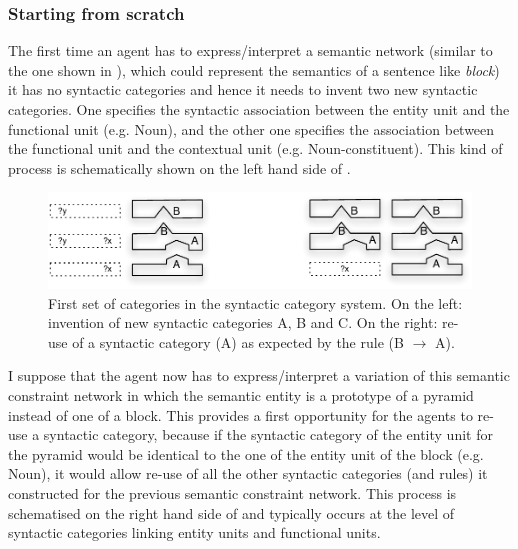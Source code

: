\subsubsection{Starting from scratch}

The first time an agent has to express/interpret a semantic network
(similar to the one shown in ), which
could represent the semantics of a sentence like \textit{block}) it has no
syntactic categories and hence it needs to invent two new syntactic
categories. One specifies the syntactic association between the entity
unit and the functional unit (e.g. Noun), and the other one specifies
the association between the functional unit and the contextual unit
(e.g. Noun-constituent). This kind of process is schematically shown
on the left hand side of .

\begin{figure}[htbp]
  \begin{center}
    \includegraphics[width=\textwidth]{./composition/figures/mapping-1.pdf}
    \caption[First set of categories in the syntactic category
    system]{First set of categories in the syntactic category system. On
      the left: invention of new syntactic categories A, B and C. On
      the right: re-use of a syntactic category (A) as expected by the
      rule (B $\rightarrow$ A).}
    \label{f:map-syntactic-categories-1}
  \end{center}
\end{figure}

I suppose that the agent now has to express/interpret a variation of
this semantic constraint network in which the semantic entity is a
prototype of a pyramid instead of one of a block. This provides a
first opportunity for the agents to re-use a syntactic category, because
if the syntactic category of the entity unit for the pyramid would be
identical to the one of the entity unit of the block (e.g. Noun), it
would allow re-use of all the other syntactic categories (and rules) it
constructed for the previous semantic constraint network. This process
is schematised on the right hand side of  and typically occurs at the level
of syntactic categories linking entity units and functional units.

